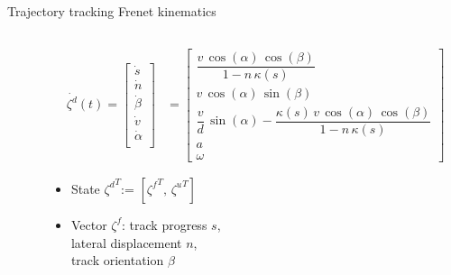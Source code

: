 \documentclass[10pt,aspectratio=1610]{beamer} %
\begin{document}
\begin{frame}{Trajectory tracking Frenet kinematics}
	\begin{columns}[onlytextwidth]
		\begin{column}{0.5\textwidth}
			\begin{center}
			\def\svgwidth{1.0\textwidth}
			
			\end{center}
		\end{column}
		\begin{column}{0.5\textwidth}
		\begin{align*}
			\dot{\zeta^{d}}(t) = \begin{bmatrix}
			\dot{s}\\
			\dot{n}\\
			\dot{\beta}\\
			\dot{v}\\
			\dot{\alpha}\\
		\end{bmatrix} &= 
		\begin{bmatrix}
			\dfrac{v\, \cos(\alpha)\, \cos(\beta)}{1 - n\, \kappa(s)}\\
			v\, \cos(\alpha)\, \sin(\beta)\\
			\dfrac{v}{d}\, \sin(\alpha) - \dfrac{\kappa(s)\, v\, \cos(\alpha)\, \cos(\beta)}{1 - n\, \kappa(s)}\\
			a\\
			\omega 
		\end{bmatrix}
		\end{align*}
		\begin{itemize}[label=\textbullet]
			\item State ${\zeta^{d}}^T$:= $[{\zeta^{f}}^T,\,{\zeta^{u}}^T]$
			\item Vector $\zeta^{f}$: track progress $s$,\\ 
			\hspace{0.62in} lateral displacement $n$,\\ 
			\hspace{0.62in} track orientation $\beta$
		\end{itemize}
		\end{column}
	\end{columns}
\end{frame}
\end{document}
